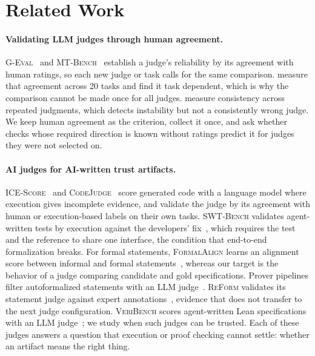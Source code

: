 \section{Related Work}
\paragraph{Validating LLM judges through human agreement.}
\textsc{G-Eval}~\citep{Liu2023GEval} and \textsc{MT-Bench}~\citep{Zheng2023MTBench} establish a judge's reliability by its agreement with human ratings, so each new judge or task calls for the same comparison.
\citet{Kocmi2024HumanVsLLM} measure that agreement across 20 tasks and find it task dependent, which is why the comparison cannot be made once for all judges.
\citet{Li2024TrustLLMJudgments} measure consistency across repeated judgments, which detects instability but not a consistently wrong judge.
We keep human agreement as the criterion, collect it once, and ask whether checks whose required direction is known without ratings predict it for judges they were not selected on.

\paragraph{AI judges for AI-written trust artifacts.}
\textsc{ICE-Score}~\citep{Zhuo2024ICEScore} and \textsc{CodeJudge}~\citep{TongZhang2024CodeJudge} score generated code with a language model where execution gives incomplete evidence, and validate the judge by its agreement with human or execution-based labels on their own tasks.
\textsc{SWT-Bench} validates agent-written tests by execution against the developers' fix~\citep{mundler2024swtbench}, which requires the test and the reference to share one interface, the condition that end-to-end formalization breaks.
For formal statements, \textsc{FormalAlign} learns an alignment score between informal and formal statements~\citep{lu2024formalalign}, whereas our target is the behavior of a judge comparing candidate and gold specifications.
Prover pipelines filter autoformalized statements with an LLM judge~\citep{lin2025goedelprover,wang2025kiminaprover}.
\textsc{ReForm} validates its statement judge against expert annotations~\citep{chen2026reform}, evidence that does not transfer to the next judge configuration.
\textsc{VeriBench} scores agent-written Lean specifications with an LLM judge~\citep{miranda2026veribench}; we study when such judges can be trusted.
Each of these judges answers a question that execution or proof checking cannot settle: whether an artifact means the right thing.

